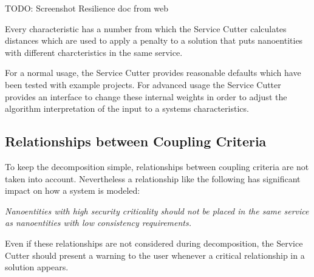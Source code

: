 TODO: Screenshot Resilience doc from web

Every characteristic has a number from which the Service Cutter calculates distances which are used to apply a penalty to a solution that puts nanoentities with different charcteristics in the same service. 

For a normal usage, the Service Cutter provides reasonable defaults which have been tested with example projects. For advanced usage the Service Cutter provides an interface to change these internal weights in order to adjust the algorithm interpretation of the input to a systems characteristics. 

\subsection{Relationships between Coupling Criteria}

To keep the decomposition simple, relationships between coupling criteria are not taken into account. Nevertheless a relationship like the following has significant impact on how a system is modeled:

\textit{Nanoentities with high security criticality should not be placed in the same service as nanoentities with low consistency requirements.}

Even if these relationships are not considered during decomposition, the Service Cutter should present a warning to the user whenever a critical relationship in a solution appears.
